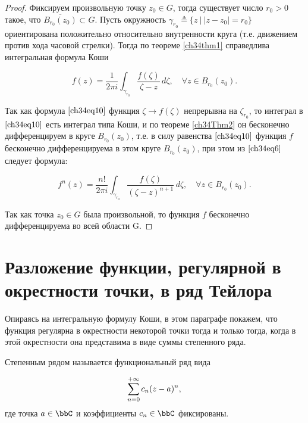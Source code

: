 \begin{proof}
Фиксируем произвольную точку $z_0 \in G$, тогда существует число $r_0 > 0$ такое, что $\overline{B_{r_0}(z_0)}\subset G$. Пусть окружность $\gamma_{r_0} \triangleq \{ z \: \bigl| \: |z - z_0| = r_0 \}$ ориентирована положительно относительно внутренности круга (т.е. движением против хода часовой стрелки). Тогда по теореме \ref{ch34thm1} справедлива интегральная формула Коши

\begin{equation} \label{ch34eq10}
f(z) = \frac{1}{2\pi i} \int_{\gamma_{r_0}} \frac{f(\zeta)}{\zeta - z} \,d\zeta, \quad \forall z \in B_{r_0}(z_0).
\end{equation}

Так как формула $\eqref{ch34eq10}$ функция $\zeta \to f(\zeta)$ непрерывна на $\zeta_{r_0}$, то интеграл в $\eqref{ch34eq10}$ есть интеграл типа Коши, и по теореме \ref{ch34Thm2} он бесконечно дифференцируем в круге $B_{r_0}(z_0)$, т.е. в силу равенства $\eqref{ch34eq10}$ функция $f$ бесконечно дифференцируема в этом круге $B_{r_0}(z_0)$, при этом из $\eqref{ch34eq6}$ следует формула:

\begin{equation} \label{ch34eq11}
f^{n}(z) = \frac{n!}{2\pi i} \int_{\gamma_{r_0}} \frac{f(\zeta)}{(\zeta - z)^{n+1}}\,d\zeta, \quad \forall z \in B_{r_0}(z_0).
\end{equation}


Так как точка $z_0 \in G$ была произвольной, то функция $f$ бесконечно дифференцируема во всей области G.
\end{proof}


\section{Разложение функции, регулярной в окрестности точки, в ряд Тейлора}

Опираясь на интегральную формулу Коши, в этом параграфе покажем, что функция регулярна в окрестности некоторой точки тогда и только тогда, когда в этой окрестности она представима в виде суммы степенного ряда.

\begin{defn}
$\textit{Степенным рядом}$ называется функциональный ряд вида

\begin{equation} \label{ch34.2eq1}
\sum_{n = 0}^{+\infty}\limits c_n (z - a)^n,
\end{equation}
где точка $a \in \bbC$ и коэффициенты $c_n \in \bbC$ фиксированы.
\end{defn}

